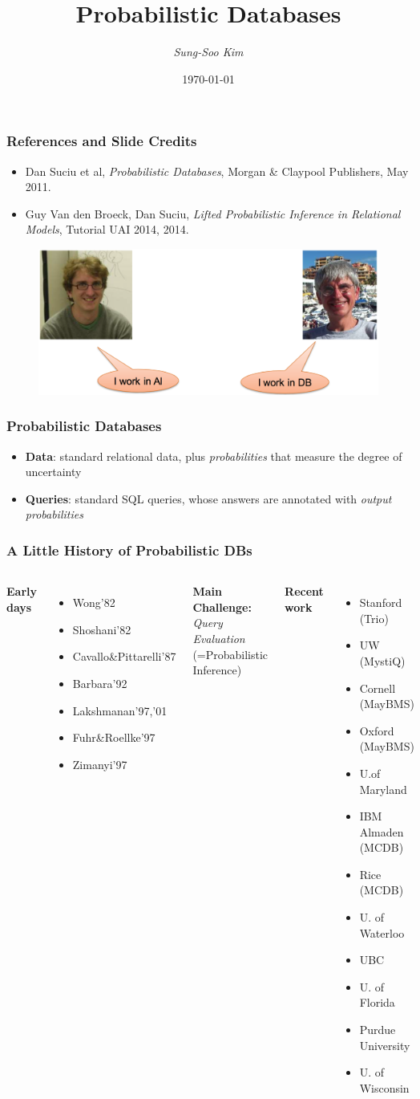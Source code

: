 \documentclass{beamer}
\title[\textit{Flying KIWI}]{Probabilistic Databases} %
\author{\textit{Sung-Soo Kim}} %
\institute[ETRI] %
{
\textit{sungsoo@etri.re.kr} \\ %
\medskip
Data Management Research Section, ETRI %
}
\date{\today} %
\newcommand{\bi}{\begin{itemize}}
\newcommand{\ei}{\end{itemize}}
\newcommand{\ii}{\item}
\newcommand*{\mygreen}[1]{\textcolor{mygreen}{#1}}
\newcommand*{\myblue}[1]{\textcolor{myblue}{#1}}
\begin{document}
\begin{frame}
\titlepage %
\end{frame}

\begin{frame}
\frametitle{References and Slide Credits}
\bi
\ii Dan Suciu et al, \textit{Probabilistic Databases}, Morgan \& Claypool Publishers, May 2011.
\ii Guy Van den Broeck, Dan Suciu, \textit{Lifted Probabilistic Inference in Relational Models}, Tutorial UAI 2014, 2014.
\ei

\begin{figure}[h]
\centering\includegraphics[width=0.91\linewidth]{authors.png}
\end{figure}

\end{frame}

\begin{frame}
\frametitle{Probabilistic Databases}
\bi
\ii \textbf{Data}: standard relational data, plus \myblue{\textit{probabilities}} that measure the degree of uncertainty
\ei
\bi
\ii \textbf{Queries}: standard SQL queries, whose answers are annotated with \myblue{\textit{output probabilities}}
\ei
\end{frame}


\begin{frame}
\frametitle{A Little History of Probabilistic DBs}
\begin{columns}[c] %

\textbf{Early days}
\bi
\ii Wong'82
\ii Shoshani'82
\ii Cavallo\&Pittarelli'87
\ii Barbara'92
\ii Lakshmanan'97,'01
\ii Fuhr\&Roellke'97
\ii Zimanyi'97
\ei
\textbf{Main Challenge:}\\
\mygreen{\textit{Query Evaluation}}\\
(=Probabilistic Inference)

\textbf{Recent work}
\bi
\ii Stanford (Trio)
\ii UW (MystiQ)
\ii Cornell (MayBMS)
\ii Oxford (MayBMS)
\ii U.of Maryland
\ii IBM Almaden (MCDB)
\ii Rice (MCDB)
\ii U. of Waterloo
\ii UBC
\ii U. of Florida
\ii Purdue University
\ii U. of Wisconsin
\ei

\end{columns}
\end{frame}
\end{document}
